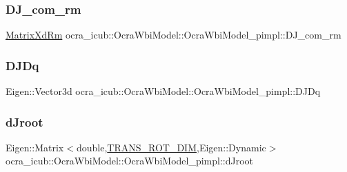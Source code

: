 \hypertarget{structOcraWbiModel_1_1OcraWbiModel__pimpl_a864b4ce170b3526fba0f7e832bfbb2d8}{}\label{structOcraWbiModel_1_1OcraWbiModel__pimpl_a864b4ce170b3526fba0f7e832bfbb2d8} 
\subsubsection{\texorpdfstring{D\+J\+\_\+com\+\_\+rm}{DJ\_com\_rm}}
{\footnotesize\ttfamily \hyperlink{namespaceocra__icub_aa5e36a19ed031c28ca83c207bd7dd83f}{Matrix\+Xd\+Rm} ocra\+\_\+icub\+::\+Ocra\+Wbi\+Model\+::\+Ocra\+Wbi\+Model\+\_\+pimpl\+::\+D\+J\+\_\+com\+\_\+rm}

\hypertarget{structOcraWbiModel_1_1OcraWbiModel__pimpl_accd197872291c3e90272b8ebd87cefc8}{}\label{structOcraWbiModel_1_1OcraWbiModel__pimpl_accd197872291c3e90272b8ebd87cefc8} 
\subsubsection{\texorpdfstring{D\+J\+Dq}{DJDq}}
{\footnotesize\ttfamily Eigen\+::\+Vector3d ocra\+\_\+icub\+::\+Ocra\+Wbi\+Model\+::\+Ocra\+Wbi\+Model\+\_\+pimpl\+::\+D\+J\+Dq}

\hypertarget{structOcraWbiModel_1_1OcraWbiModel__pimpl_afaba1181f7d08272208e372e2e23106c}{}\label{structOcraWbiModel_1_1OcraWbiModel__pimpl_afaba1181f7d08272208e372e2e23106c} 
\subsubsection{\texorpdfstring{d\+Jroot}{dJroot}}
{\footnotesize\ttfamily Eigen\+::\+Matrix$<$double,\hyperlink{OcraWbiModel_8cpp_ab4a87cb824ceff256c6b8bce7701af58}{T\+R\+A\+N\+S\+\_\+\+R\+O\+T\+\_\+\+D\+IM},Eigen\+::\+Dynamic$>$ ocra\+\_\+icub\+::\+Ocra\+Wbi\+Model\+::\+Ocra\+Wbi\+Model\+\_\+pimpl\+::d\+Jroot}

